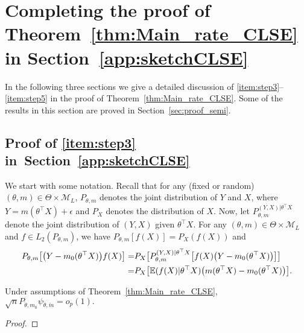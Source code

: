 {\section{Completing the proof of Theorem~\ref{thm:Main_rate_CLSE} in Section~\ref{app:sketchCLSE}}\label{app:stepsCLSE}
In the following three sections we give a detailed discussion of \ref{item:step3}--\ref{item:step5} in the proof of Theorem~\ref{thm:Main_rate_CLSE}.  Some of the results in this section are proved in Section~\ref{sec:proof_semi}.

\subsection{Proof of \ref{item:step3} in~Section~\ref{app:sketchCLSE}}\label{proof:lip:nobias}
We start with some notation. Recall that for any (fixed or random) $(\theta, m) \in \Theta\times\mathcal{M}_L$, $P_{\theta,m}$ denotes the joint distribution of $Y$ and $X$, where $Y=m(\theta^\top X) +\epsilon$ and $P_X$ denotes the distribution of $X$. Now, let $ P_{\theta,m}^{(Y,X)|\theta^\top X}$ denote the joint distribution of $(Y,X)$ given $\theta^\top X$. For any $(\theta,m) \in \Theta\times \mathcal{M}_L$ and $f \in L_2(P_{\theta,m})$, we have
$P_{\theta,m}[f(X)]= P_X(f(X))$ and
\begin{align}\label{eq:def_EX_X}
\begin{split}
P_{\theta,m} \big[\big(Y-m_0(\theta^\top X)\big) f(X)\big]=& P_X\big[   P_{\theta,m}^{(Y,X)|\theta^\top X} \big[f(X)\big(Y-m_0(\theta^\top X)\big)\big] \big]\\=&P_X\big[ \mathbb{E}( f(X)|\theta^\top X) \big(m(\theta^\top X)-m_0(\theta^\top X)\big) \big].
\end{split}
\end{align}
\begin{thm}[\ref{item:step3}] \label{LIP:thm:nobiasCLSE}
Under assumptions of Theorem~\ref{thm:Main_rate_CLSE}, $\sqrt{n} P_{\check{\theta}, m_0} \psi_{\check{\theta},\check{m}} =o_p(1).$
\end{thm}

\begin{proof}


\end{proof}}
